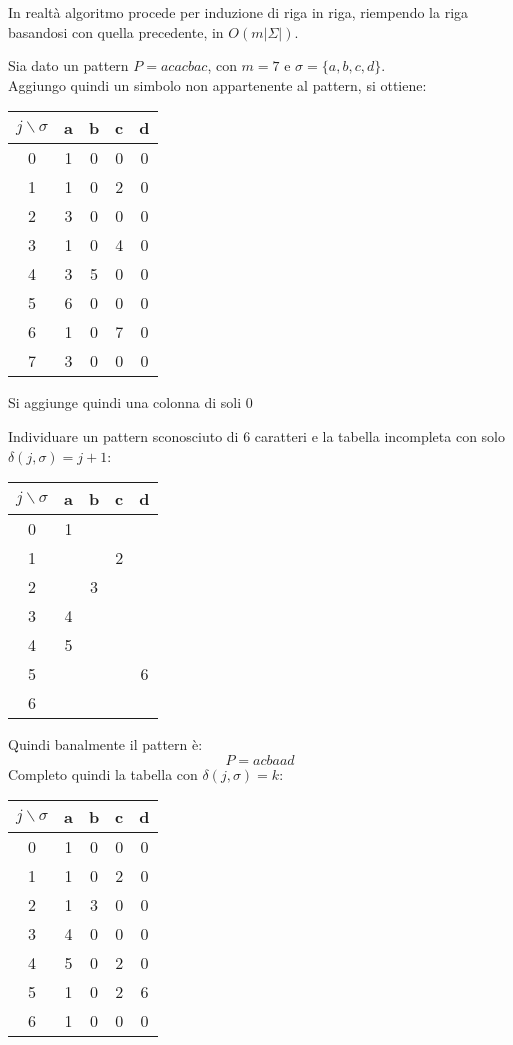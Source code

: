 In realtà algoritmo procede per induzione di riga in riga, riempendo la riga
basandosi con quella precedente, in $O(m|\Sigma|)$.\\
\newpage
\begin{esempio}
  Sia dato un pattern $P=acacbac$, con $m=7$ e $\sigma=\{a,b,c,d\}$.\\
  Aggiungo quindi un simbolo non appartenente al pattern, si ottiene:
   \begin{table}[H]
    \centering
    \begin{tabular}[H]{c||c|c|c|c}
      $j\backslash\sigma$ & a & b & c & d\\
      \hline
      \hline
      0 & 1 & 0 & 0 & 0\\
      1 & 1 & 0 & 2 & 0\\
      2 & 3 & 0 & 0 & 0\\
      3 & 1 & 0 & 4 & 0\\
      4 & 3 & 5 & 0 & 0\\ 
      5 & 6 & 0 & 0 & 0\\
      6 & 1 & 0 & 7 & 0\\
      7 & 3 & 0 & 0 & 0      
    \end{tabular}
  \end{table}
  Si aggiunge quindi una colonna di soli 0
\end{esempio}

\begin{esempio}
  Individuare un pattern sconosciuto di 6 caratteri e la tabella incompleta con
  solo $\delta(j,\sigma)=j+1$:
  \begin{table}[H]
    \centering
    \begin{tabular}[H]{c||c|c|c|c}
      $j\backslash\sigma$ & a & b & c & d\\
      \hline
      \hline
      0 & 1 &  &  & \\
      1 &  &  & 2 & \\
      2 &  & 3 &  & \\
      3 & 4 &  &  & \\
      4 & 5 &  &  & \\ 
      5 &  &  &  & 6\\
      6 &  &  &  &   
    \end{tabular}
  \end{table}
  Quindi banalmente il pattern è:
  \[P=acbaad\]
  Completo quindi la tabella con $\delta(j,\sigma)=k$:
  \begin{table}[H]
    \centering
    \begin{tabular}[H]{c||c|c|c|c}
      $j\backslash\sigma$ & a & b & c & d\\
      \hline
      \hline
      0 & 1 & 0 & 0 & 0\\
      1 &  1& 0 & 2 &0 \\
      2 &  1& 3 & 0 & 0\\
      3 & 4 & 0 & 0 & 0\\
      4 & 5 & 0 &2  &0 \\ 
      5 & 1 & 0 & 2 & 6\\
      6 & 1 & 0 & 0&  0 
    \end{tabular}
  \end{table}
\end{esempio}

